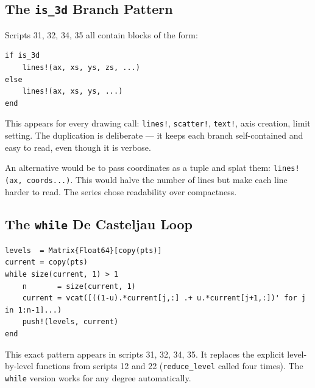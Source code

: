 \documentclass[12pt, a4paper]{article}
\newcommand{\cd}[1]{\texttt{#1}}
\begin{document}
\subsection{The \texttt{is\_3d} Branch Pattern}

Scripts 31, 32, 34, 35 all contain blocks of the form:

\begin{verbatim}
if is_3d
    lines!(ax, xs, ys, zs, ...)
else
    lines!(ax, xs, ys, ...)
end
\end{verbatim}

This appears for every drawing call: \cd{lines!},
\cd{scatter!}, \cd{text!}, axis creation, limit setting.
The duplication is deliberate --- it keeps each branch
self-contained and easy to read, even though it is verbose.

An alternative would be to pass coordinates as a tuple
and splat them: \cd{lines!(ax, coords...)}.
This would halve the number of lines but make each line
harder to read.
The series chose readability over compactness.

\subsection{The \texttt{while} De Casteljau Loop}

\begin{verbatim}
levels  = Matrix{Float64}[copy(pts)]
current = copy(pts)
while size(current, 1) > 1
    n       = size(current, 1)
    current = vcat([((1-u).*current[j,:] .+ u.*current[j+1,:])' for j in 1:n-1]...)
    push!(levels, current)
end
\end{verbatim}

This exact pattern appears in scripts 31, 32, 34, 35.
It replaces the explicit level-by-level functions from
scripts 12 and 22 (\cd{reduce\_level} called four times).
The \cd{while} version works for any degree automatically.

\begin{center}
\end{center}
\end{document}
